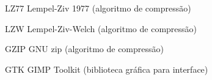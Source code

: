 \documentclass[
	12pt,				%
	openright,			%
	oneside,			%
	a4paper,			%
	english,			%
	french,				%
	spanish,			%
	brazil,				%
	]{lib/abntex2}
\begin{document}

\listoftables*
\cleardoublepage

\begin{siglas}
	\item[LZ77] Lempel-Ziv 1977 (algoritmo de compressão)
	\item[LZW] Lempel-Ziv-Welch (algoritmo de compressão)
    \item[GZIP] GNU zip (algoritmo de compressão)
    \item[GTK] GIMP Toolkit (biblioteca gráfica para interface)
	
\end{siglas}


\tableofcontents*
\cleardoublepage



\pagestyle{simple}











\postextual






\end{document}
